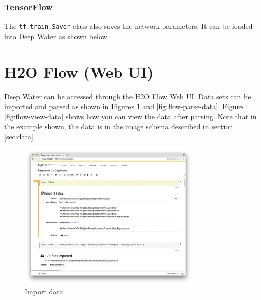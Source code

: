 \waterExampleInPython


			\subsubsection{TensorFlow}
				The \texttt{tf.train.Saver} class also saves the network parameters.  It can be loaded into Deep Water as shown below.
				
\waterExampleInPython


\newpage
\section{H2O Flow (Web UI)}
	Deep Water can be accessed through the H2O Flow Web UI.  Data sets can be imported and parsed as shown in Figures \ref{fig:flow-import-data} and \ref{fig:flow-parse-data}. Figure \ref{fig:flow-view-data} shows how you can view the data after parsing. Note that in the example shown, the data is in the image schema described in section \ref{sec:data}.
	

	\begin{figure}[ht]
	\begin{center}
		\includegraphics[width=0.77\textwidth]{images/flow-import-data.png}
		\caption{Import data}\label{fig:flow-import-data}
	\end{center}
	\end{figure}
	
